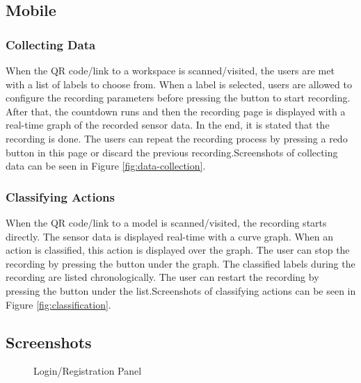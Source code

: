 \subsection{Mobile}

\subsubsection{Collecting Data}
When the QR code/link to a workspace is scanned/visited, the users are met with a list of labels to choose from. When a label is selected, users are allowed to configure the recording parameters before pressing the button to start recording. After that, the countdown runs and then the recording page is displayed with a real-time graph of the recorded sensor data. In the end, it is stated that the recording is done. The users can repeat the recording process by pressing a redo button in this page or discard the previous recording.\newline Screenshots of collecting data can be seen in Figure \ref{fig:data-collection}.

\subsubsection{Classifying Actions}
When the QR code/link to a model is scanned/visited, the recording starts directly. The sensor data is displayed real-time with a curve graph. When an action is classified, this action is displayed over the graph. The user can stop the recording by pressing the button under the graph. The classified labels during the recording are listed chronologically. The user can restart the recording by pressing the button under the list.\newline Screenshots of classifying actions can be seen in Figure \ref{fig:classification}.

\subsection{Screenshots}

\begin{figure}[hb]
    \centering
    \caption{Login/Registration Panel}
    \label{fig:login}
\end{figure}


